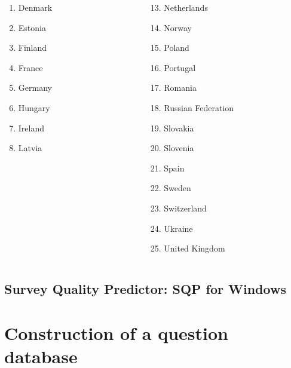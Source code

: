 \documentclass{beamer}
\begin{document}
\begin{frame}
\begin{columns}[T]
\begin{column}{4.5cm}
\begin{columns}
\begin{column}{2cm}
\begin{scriptsize}
\begin{enumerate}
						\item Denmark 	
						\item Estonia 	
						\item Finland 	
						\item France 	
						\item Germany 	
						\item Hungary 	
						\item Ireland
						\item Latvia													
					\end{enumerate}\end{scriptsize}
				\end{column}
				\begin{column}{2.5cm}
					\begin{scriptsize}\begin{enumerate}		
						\item[13.] Netherlands			
						\item[14.] Norway 	
						\item[15.] Poland 	
						\item[16.] Portugal 	
						\item[17.] Romania 	
						\item[18.] Russian Federation 	
						\item[19.] Slovakia 	
						\item[20.] Slovenia 	
						\item[21.] Spain 	
						\item[22.] Sweden 	
						\item[23.] Switzerland 	
						\item[24.] Ukraine
						\item[25.] United Kingdom 
					\end{enumerate}\end{scriptsize}
				\end{column}
			\end{columns}
		\end{column}
	\end{columns}
\end{frame}

\subsection{Survey Quality Predictor: SQP for Windows}

\section{Construction of a question database}
\end{document}
